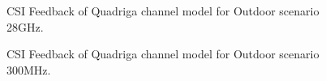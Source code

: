 \documentclass[lettersize,journal]{IEEEtran}
\begin{document}
	
\begin{figure}[ht]
		\centering
		\hfill
		\hfill
		\caption{CSI Feedback of Quadriga channel model for Outdoor scenario 28GHz.}
		\label{fig:quadriga_28ghz}
	\end{figure}
	
	\begin{figure}[ht]
		\centering
		\hfill
		\hfill
		\caption{CSI Feedback of Quadriga channel model for Outdoor scenario 300MHz.}
		\label{fig:quadriga_300mhz}
	\end{figure}
	
\end{document}
